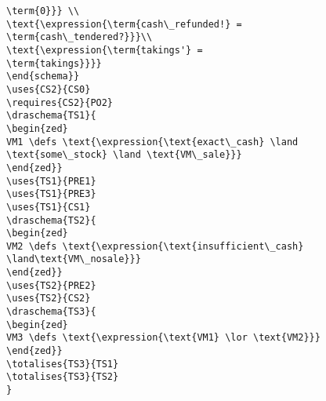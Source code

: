 \begin{verbatim}
\term{0}}} \\
\text{\expression{\term{cash\_refunded!} =
\term{cash\_tendered?}}}\\
\text{\expression{\term{takings'} =
\term{takings}}}}
\end{schema}}
\uses{CS2}{CS0}
\requires{CS2}{PO2}
\draschema{TS1}{
\begin{zed}
VM1 \defs \text{\expression{\text{exact\_cash} \land
\text{some\_stock} \land \text{VM\_sale}}}
\end{zed}}
\uses{TS1}{PRE1}
\uses{TS1}{PRE3}
\uses{TS1}{CS1}
\draschema{TS2}{
\begin{zed}
VM2 \defs \text{\expression{\text{insufficient\_cash}
\land\text{VM\_nosale}}}
\end{zed}}
\uses{TS2}{PRE2}
\uses{TS2}{CS2}
\draschema{TS3}{
\begin{zed}
VM3 \defs \text{\expression{\text{VM1} \lor \text{VM2}}}
\end{zed}}
\totalises{TS3}{TS1}
\totalises{TS3}{TS2}
}

\end{verbatim}